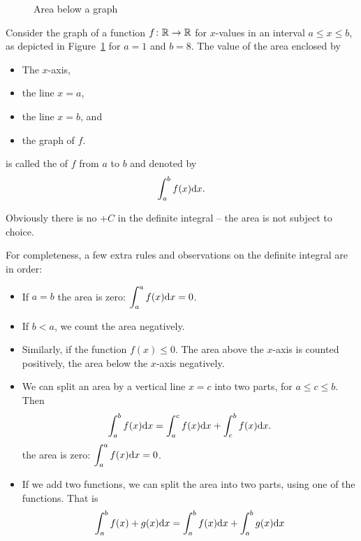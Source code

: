 \begin{figure}
\begin{center}
\end{center}
\caption{Area below a graph}
\label{figareabelow}
\end{figure}
\begin{defn}
Consider the graph of a function $f\colon{\mathbb R}\to{\mathbb R}$ for $x$-values in an
interval $a\le x\le b$, as depicted in Figure~\ref{figareabelow} for $a=1$ and $b=8$. The value of the area enclosed by
\begin{itemize}
\item The $x$-axis,
\item the line $x=a$,
\item the line $x=b$, and
\item the graph of $f$.
\end{itemize}
is called the  of $f$ from $a$ to $b$ and denoted by
\[
\int_a^b f(x){\mbox{d}}x.
\]
\end{defn}
Obviously there is no $+C$ in the definite integral -- the area is not subject to
choice.
\begin{note}
\label{defintprop}
For completeness, a few extra rules and observations on the definite integral are in order:
\begin{itemize}
\item If $a=b$ the area is zero: $\displaystyle\int_a^a f(x){\mbox{d}}x=0$.
\item If $b<a$, we count the area negatively.
\item Similarly, if the function $f(x)\le 0$. The area above the $x$-axis is counted positively, the area below the $x$-axis negatively.
\item We can split an area by a vertical line $x=c$ into two parts, for $a\le c\le b$. Then
\[
\int_a^b f(x){\mbox{d}}x= \int_a^c f(x){\mbox{d}}x+ \int_c^b f(x){\mbox{d}}x.
\]
the area is zero: $\displaystyle\int_a^a f(x){\mbox{d}}x=0$.
\item
If we add two functions, we can split the area into two parts, using one of the
functions. That is
\[
\int_a^b f(x)+g(x){\mbox{d}}x=\int_a^b f(x){\mbox{d}}x+\int_a^b g(x){\mbox{d}}x
\]
\end{itemize}
\end{note}

